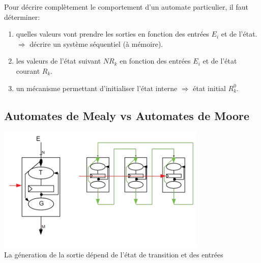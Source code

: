 Pour décrire complètement le comportement d'un automate particulier, il faut déterminer:
\begin{enumerate}
  \item quelles valeurs vont prendre les sorties en fonction des entrées $E_i$ et
  de l'état. $\Rightarrow$ décrire un système séquentiel (à mémoire).
  \item les valeurs de l'état suivant $NR_k$ en fonction des entrées $E_i$ et de
  l'état courant $R_k$.
  \item un mécanisme permettant d'initialiser l'état interne $\Rightarrow$ état
  initial $R_k^{0}$.
\end{enumerate}

\subsection{Automates de Mealy vs Automates de Moore}
\begin{center}
  \includegraphics[height=6cm]{cours1/pics/mealy.png}
  \\La géneration de la sortie dépend de l'état de transition et des entrées
\end{center}

